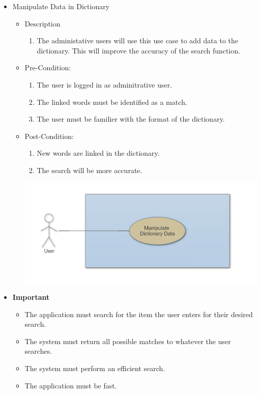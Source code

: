 \documentclass[a4paper,10pt]{article}
\begin{document}
\begin{enumerate}
\begin{itemize}
\begin{itemize}
			\end{itemize}
			\item Manipulate Data in Dictionary
			\begin{itemize}
				\item Description
					\begin{enumerate}
						\item The administative users will use this use case to add data to the dictionary. This will improve the accuracy of the search function.
					\end{enumerate}
				\item Pre-Condition:
					\begin{enumerate}	
						\item The user is logged in as adminitrative user.
						\item The linked words must be identified as a match.
						\item The user must be familier with the format of the dictionary.
					\end{enumerate}
				\item Post-Condition:
					\begin{enumerate}
						\item New words are linked in the dictionary.
						\item The search will be more accurate.
					\end{enumerate}
		 \includegraphics[scale=0.62]{Diagrams/ManipulateDictionaryUseCase.png}\\
		\end{itemize} 
		
		\item \textbf{Important} 
		\begin{itemize}
                \item The application must search for the item the user enters for their desired search. 
                \item The system must return all possible matches to whatever the user searches.
		\item The system must perform an efficient search.
		\item The application must be fast.
                \end{itemize}
		

\end{itemize}
\end{enumerate}
\end{document}
